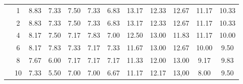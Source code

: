 \begin{table}[H]
\begin{tabular}{|c|c|c c c c c|c c c c c|}
\multicolumn{1}{|c|}{ \multirow{6}{*}{\rotatebox[origin=c]{90}{\textbf{K-vizinhos}}} }
&1	&8.83&	7.33&	7.50&	7.33&	6.83&	13.17&	12.33&	12.67&	11.17&	10.33 \\\cline{2-12}
&2	&8.83&	7.33&	7.50&	7.33&	6.83&	13.17&	12.33&	12.67&	11.17&	10.33 \\\cline{2-12}
&4	&8.17&	7.50&	7.17&	7.83&	7.00&	12.50&	13.00&	11.83&	11.17&	10.00 \\\cline{2-12}
&6	&8.17&	7.83&	7.33&	7.17&	7.33&	11.67&	13.00&	12.67&	10.00&	9.50\\\cline{2-12}
&8	&7.67&	6.00&	7.17&	7.17&	7.17&	11.33&	12.00&	13.00&	9.17&	9.83\\\cline{2-12}
&10	&7.33&	5.50&	7.00&	7.00&	6.67&	11.17&	12.17&	13,00&	8.00&	9.50%
\\\midrule





	\end{tabular}
\end{table}




